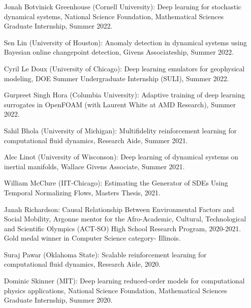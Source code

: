 \documentclass[letterpaper]{article}
\renewenvironment{itemize}{
  \begin{list}{}{
    \setlength{\leftmargin}{1.5em}
  }
}{
  \end{list}
}
\begin{document}
\begin{itemize}

  \item Jonah Botvinick Greenhouse (Cornell University): Deep learning for stochastic dynamical systems, National Science Foundation, Mathematical Sciences Graduate Internship, Summer 2022.

  \item Sen Lin (University of Houston): Anomaly detection in dynamical systems using Bayesian online changepoint detection, Givens Associateship, Summer 2022.

  \item Cyril Le Doux (University of Chicago): Deep learning emulators for geophysical modeling, DOE Summer Undergraduate Internship (SULI), Summer 2022.

  \item Gurpreet Singh Hora (Columbia University): Adaptive training of deep learning surrogates in OpenFOAM (with Laurent White at AMD Research), Summer 2022.

  \item Sahil Bhola (University of Michigan): Multifidelity reinforcement learning for computational fluid dynamics, Research Aide, Summer 2021.

  \item Alec Linot (University of Wisconson): Deep learning of dynamical systems on inertial manifolds, Wallace Givens Associate, Summer 2021.

  \item William McClure (IIT-Chicago): Estimating the Generator of SDEs Using Temporal Normalizing Flows, Masters Thesis, 2021. 

  \item Janah Richardson: Causal Relationship Between Environmental Factors and Social Mobility, Argonne mentor for the Afro-Academic, Cultural, Technological and Scientific Olympics (ACT-SO) High School Research Program, 2020-2021. Gold medal winner in Computer Science category- Illinois.

  \item Suraj Pawar (Oklahoma State): Scalable reinforcement learning for computational fluid dynamics, Research Aide, 2020.

  \item Dominic Skinner (MIT): Deep learning reduced-order models for computational physics applications, National Science Foundation, Mathematical Sciences Graduate Internship, Summer 2020.

\end{itemize}
\end{document}
